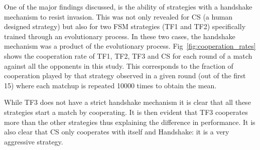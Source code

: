 \documentclass[10pt,letterpaper]{article}
\begin{document}
One of the major findings discussed, is
the ability of strategies with a handshake mechanism to resist invasion. This
was not only revealed for CS (a human designed strategy) but also for
two FSM strategies (TF1 and TF2) specifically trained through an evolutionary
process. In these two cases, the handshake mechanism was a product of the
evolutionary process. Fig~\ref{fig:cooperation_rates} shows the cooperation
rate of TF1, TF2, TF3 and CS
for each round of a match against all the opponents in this study.
This corresponds to the fraction of cooperation played by that strategy observed
in a given round (out of the first 15) where each matchup is repeated 10000 times to
obtain the mean.

While TF3
does not have a strict handshake mechanism it is clear that all these strategies
start a match by cooperating. It is then evident that TF3 cooperates more than
the other strategies thus explaining the difference in performance. It is also
clear that CS only cooperates with itself and Handshake: it is a very aggressive
strategy.
\end{document}
